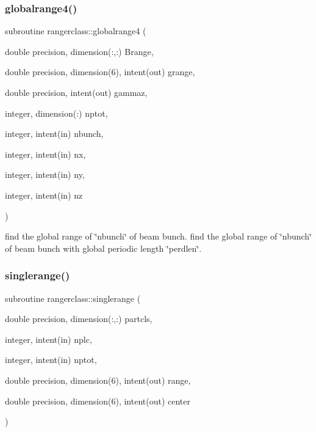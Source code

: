 \mbox{\label{namespacerangerclass_aa1f850f78b90482f120d7104efc7bcdf}} 
\subsubsection{\texorpdfstring{globalrange4()}{globalrange4()}}
{\footnotesize\ttfamily subroutine rangerclass\+::globalrange4 (\begin{DoxyParamCaption}\item[{double precision, dimension(\+:,\+:)}]{Brange,  }\item[{double precision, dimension(6), intent(out)}]{grange,  }\item[{double precision, intent(out)}]{gammaz,  }\item[{integer, dimension(\+:)}]{nptot,  }\item[{integer, intent(in)}]{nbunch,  }\item[{integer, intent(in)}]{nx,  }\item[{integer, intent(in)}]{ny,  }\item[{integer, intent(in)}]{nz }\end{DoxyParamCaption})}



find the global range of \char`\"{}nbunch\char`\"{} of beam bunch. find the global range of \char`\"{}nbunch\char`\"{} of beam bunch with global periodic length \char`\"{}perdlen\char`\"{}. 

\mbox{\label{namespacerangerclass_a5e8eb23d6d5bf16cd2d36cd10ecf6f70}} 
\subsubsection{\texorpdfstring{singlerange()}{singlerange()}}
{\footnotesize\ttfamily subroutine rangerclass\+::singlerange (\begin{DoxyParamCaption}\item[{double precision, dimension(\+:,\+:)}]{partcls,  }\item[{integer, intent(in)}]{nplc,  }\item[{integer, intent(in)}]{nptot,  }\item[{double precision, dimension(6), intent(out)}]{range,  }\item[{double precision, dimension(6), intent(out)}]{center }\end{DoxyParamCaption})}



